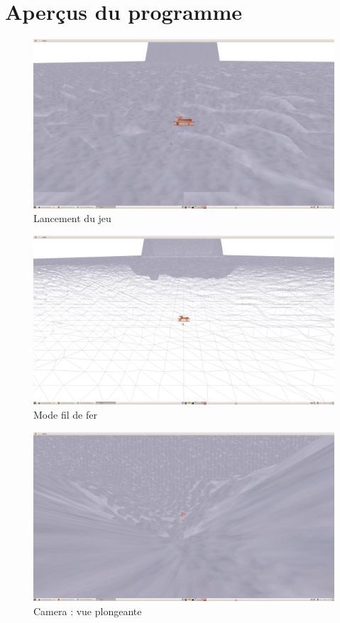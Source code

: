 \documentclass{report}
\begin{document}
\chapter{Aperçus du programme}

\begin{figure}[hbtp]
\caption{Lancement du jeu}
\centering
\includegraphics[scale=0.2]{./images/1.png}
\end{figure}

\begin{figure}[hbtp]
\caption{Mode fil de fer}
\centering
\includegraphics[scale=0.2]{./images/2.png}
\end{figure}

\begin{figure}[hbtp]
\caption{Camera : vue plongeante}
\centering
\includegraphics[scale=0.2]{./images/3.png}
\end{figure}
\end{document}
